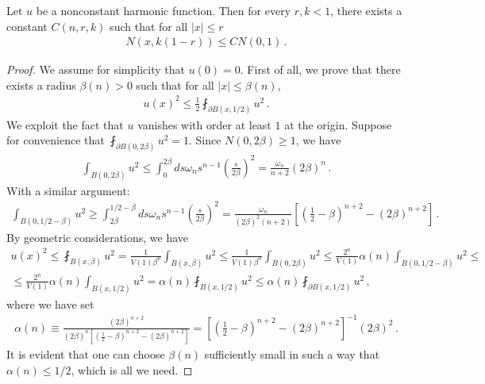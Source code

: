 \documentclass[11pt]{article}
\begin{document}
\begin{theorem}\label{th_cN}
 Let $u$ be a nonconstant harmonic function. Then for every $r,k<1$, there exists a constant $C(n,r,k)$ such that for all ${\left|x\right|} \leq r$
 \begin{gather}
  N(x,k(1-r))\leq C N(0,1)\, .
 \end{gather}
\end{theorem}
\begin{proof}
We assume for simplicity that $u(0)=0$. First of all, we prove that there exists a radius $\beta(n)>0$ such that for all ${\left|x\right|} \leq \beta(n)$,
 \begin{gather}\label{eq_alpha}
 u(x)^2 \leq \frac{1}{2} \fint_{\partial B(x,1/2)} u^2\, .
\end{gather}
We exploit the fact that $u$ vanishes with order at least $1$ at the origin. Suppose for convenience that $\fint_{\partial B(0,2\beta)} u^2 =1$. Since $N(0,2\beta)\geq 1$, we have
\begin{gather}
 \int_{B(0,2\beta)} u^2 \leq \int_0^{2\beta} ds \omega_n s^{n-1} {\left({\frac{s}{2\beta}}\right)}^2 = \frac{\omega_n}{n+2} (2\beta)^n\, .
\end{gather}
With a similar argument:
\begin{gather}
 \int_{B(0,1/2-\beta)} u^2 \geq \int_{2\beta}^{1/2-\beta} ds \omega_n s^{n-1} {\left({\frac{s}{2\beta}}\right)}^2 = \frac{\omega_n}{(2\beta)^2(n+2)} {\left[{{\left({\frac 1 2 - \beta}\right)}^{n+2} -(2\beta)^{n+2}}\right]}\, .
\end{gather}
By geometric considerations, we have
\begin{gather}
 u(x)^2\leq \fint_{B(x,\beta)} u^2 = \frac{1}{V(1) \beta^n} \int_{B(x,\beta)} u^2\leq \frac{1}{V(1) \beta^n} \int_{B(0,2\beta)} u^2\leq \frac{2^n}{V(1)} \alpha(n) \int_{B(0,1/2-\beta)} u^2\leq\\
 \leq \frac{2^n}{V(1)} \alpha(n) \int_{B(x,1/2)} u^2= \alpha(n) \fint_{B(x,1/2)} u^2\leq  \alpha(n) \fint_{\partial B(x,1/2)} u^2 \, ,
\end{gather}
where we have set
\begin{gather}
 \alpha(n) \equiv \frac{(2\beta)^{n+2}}{(2\beta)^n {\left[{{\left({\frac 1 2 - \beta}\right)}^{n+2} -(2\beta)^{n+2}}\right]}} = {\left[{{\left({\frac 1 2 - \beta}\right)}^{n+2} -(2\beta)^{n+2}}\right]}^{-1} (2\beta)^2\, .
\end{gather}
It is evident that one can choose $\beta(n)$ sufficiently small in such a way that $\alpha(n)\leq 1/2$, which is all we need.
 

\end{proof}
\end{document}

